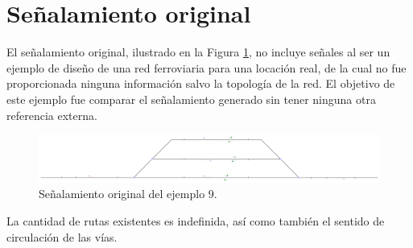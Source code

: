 \section{Señalamiento original}

	El señalamiento original, ilustrado en la Figura \ref{fig:EJ9_2}, no incluye señales al ser un ejemplo de diseño de una red ferroviaria para una locación real, de la cual no fue proporcionada ninguna información salvo la topología de la red. El objetivo de este ejemplo fue comparar el señalamiento generado sin tener ninguna otra referencia externa.
	
	\begin{figure}[H]
		\centering
		\includegraphics[width=1\textwidth]{resultados-obtenidos/ejemplo9/images/9_original.png}
		\centering\caption{Señalamiento original del ejemplo 9.}
		\label{fig:EJ9_2}
	\end{figure}
	
	La cantidad de rutas existentes es indefinida, así como también el sentido de circulación de las vías.